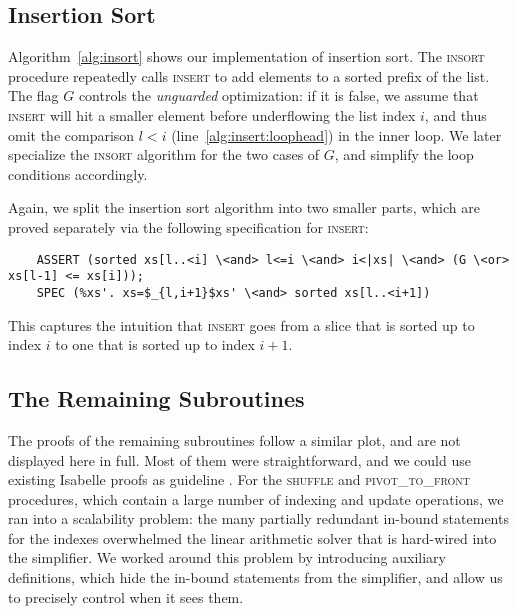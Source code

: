 \documentclass[runningheads]{llncs}
\begin{document}
  \subsection{Insertion Sort}\label{sec:insort}
  Algorithm~\ref{alg:insort} shows our implementation of insertion sort.
  The \textsc{insort} procedure repeatedly calls \textsc{insert} to add elements to a sorted prefix of the list.
  The flag $G$ controls the \emph{unguarded} optimization: if it is false, we assume that \textsc{insert} will hit a smaller
  element before underflowing the list index $i$, and thus omit the comparison $l<i$ (line~\ref{alg:insert:loophead}) in the inner loop.
  We later specialize the \textsc{insort} algorithm for the two cases of $G$, and simplify the loop conditions accordingly.



  Again, we split the insertion sort algorithm into two smaller parts, which are proved separately via the following
  specification for \textsc{insert}:
  \begin{lstlisting}
    ASSERT (sorted xs[l..<i] \<and> l<=i \<and> i<|xs| \<and> (G \<or> xs[l-1] <= xs[i]));
    SPEC (%xs'. xs=$_{l,i+1}$xs' \<and> sorted xs[l..<i+1])
  \end{lstlisting}
  This captures the intuition that \textsc{insert} goes from a slice that is sorted up to index $i$ to one that is sorted up to index $i+1$.

\subsection{The Remaining Subroutines}
  \newcommand{\leftc}{\textrm{left}}
  \newcommand{\rightc}{\textrm{right}}
  \newcommand{\hasleftc}{\textrm{has\_left}}
  \newcommand{\hasrightc}{\textrm{has\_right}}

  The proofs of the remaining subroutines follow a similar plot, and are not displayed here in full.
  Most of them were straightforward, and we could use existing Isabelle proofs as guideline \cite{LaWi19-IMP2,Gri19-AFP,La16}.
  For the \textsc{shuffle} and \textsc{pivot\_to\_front} procedures, which contain a large number of indexing and update operations,
  we ran into a scalability problem: the many partially redundant in-bound statements for
  the indexes overwhelmed the linear arithmetic solver that is hard-wired into the simplifier.
  We worked around this problem by introducing auxiliary definitions, which hide the in-bound statements from the simplifier,
  and allow us to precisely control when it sees them.
\end{document}
